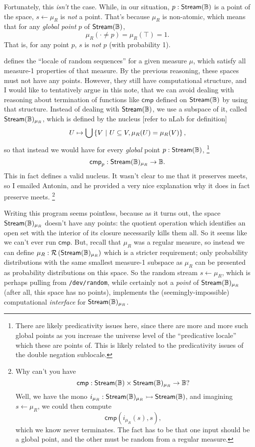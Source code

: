 Fortunately, this \emph{isn't} the case. While, in our situation, $p : \mathsf{Stream}(\mathbb{B})$ is a point of the space, $s \leftarrow \mu_R$ is \emph{not} a point. That's because $\mu_R$ is non-atomic, which means that for any \emph{global point} $p$ of $\mathsf{Stream}(\mathbb{B})$,
\[
\mu_R(\cdot \neq p) = \mu_R(\top) = 1.
\]
That is, for any point $p$, $s$ is \emph{not} $p$ (with probability 1).

\cite{simpson2012} defines the ``locale of random sequences'' for a given measure $\mu$, which satisfy all measure-1 properties of that measure. By the previous reasoning, these spaces must not have any points. However, they still have computational structure, and I would like to tentatively argue in this note, that we can avoid dealing with reasoning about termination of functions like $\mathsf{cmp}$ defined on $\mathsf{Stream}(\mathbb{B})$ by using that structure. Instead of dealing with $\mathsf{Stream}(\mathbb{B})$, we use a subspace of it, called $\mathsf{Stream}(\mathbb{B})_{\mu_R}$, which is defined by the nucleus [refer to nLab for definition]
\[
U \mapsto \bigcup \left\{ V \ |\  U \subseteq V, \mu_R(U) = \mu_R(V) \right\},
\]
so that instead we would have for every \emph{global} point $p : \mathsf{Stream}(\mathbb{B})$,
\footnote{There are likely predicativity issues here, since there are more and more such global points as you increase the universe level of the ``predicative locale'' which these are points of. This is likely related to the predicativity issues of the double negation sublocale.}
\[
\mathsf{cmp}_p : \mathsf{Stream}(\mathbb{B})_{\mu_R} \to \mathbb{B}.
\]
This in fact defines a valid nucleus. It wasn't clear to me that it preserves meets, so I emailed Antonin, and he provided a very nice explanation why it does in fact preserve meets.
\footnote{Why can't you have 
\[
\mathsf{cmp} :  \mathsf{Stream}(\mathbb{B}) \times \mathsf{Stream}(\mathbb{B})_{\mu_R} \to \mathbb{B}?
\]
Well, we have the mono $i_{\mu_R} : \mathsf{Stream}(\mathbb{B})_{\mu_R} \rightarrowtail \mathsf{Stream}(\mathbb{B})$, and imagining $s \leftarrow \mu_R$, we could then compute
\[
\mathsf{cmp}(i_{\mu_R}(s), s),
\]
which we know never terminates. The fact has to be that one input should be a global point, and the other must be random from a regular measure.}

Writing this program seems pointless, because as it turns out, the space $\mathsf{Stream}(\mathbb{B})_{\mu_R}$ doesn't have any points: the quotient operation which identifies an open set with the interior of its closure necessarily kills them all. So it seems like we can't ever run $\mathsf{cmp}$. But, recall that $\mu_R$ was a regular measure, so instead we can define $\mu_R : \mathcal{R}\left(\mathsf{Stream}(\mathbb{B})_{\mu_R} \right)$ which is a stricter requirement; only probability distributions with the same smallest measure-1 subspace as $\mu_R$ can be presented as probability distributions on this space. So the random stream $s \leftarrow \mu_R$, which is perhaps pulling from \texttt{/dev/random}, while certainly not a \emph{point} of $\mathsf{Stream}(\mathbb{B})_{\mu_R}$ (after all, this space has no points), implements the (seemingly-impossible) computational \emph{interface} for $\mathsf{Stream}(\mathbb{B})_{\mu_R}$.

